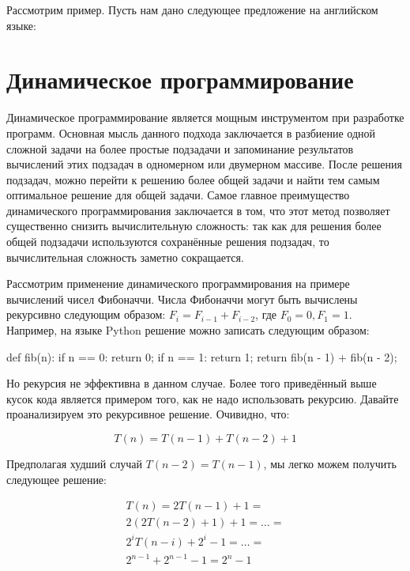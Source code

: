 Рассмотрим пример. Пусть нам дано следующее предложение на английском
языке: 


\section{Динамическое программирование}

Динамическое программирование является мощным инструментом 
при разработке программ. Основная мысль данного подхода заключается 
в разбиение одной сложной задачи на более простые подзадачи и запоминание 
результатов вычислений этих подзадач в одномерном или двумерном массиве. 
После решения подзадач, можно перейти к решению более общей задачи и найти тем 
самым оптимальное решение для общей задачи. Самое главное преимущество динамического
программирования заключается в том, что этот метод позволяет существенно снизить 
вычислительную сложность: так как для решения более общей подзадачи используются
сохранённые решения подзадач, то вычислительная сложность заметно сокращается. 

Рассмотрим применение динамического программирования на примере вычислений чисел Фибоначчи. Числа 
Фибоначчи могут быть вычислены рекурсивно следующим образом: $F_i = F_{i-1} + F_{i-2}$, 
где $F_0=0, F_1=1$. Например, на языке Python решение можно записать следующим образом:

\begin{python}
def fib(n):
	if n == 0:
		return 0;
	if n == 1:
		return 1;
	return fib(n - 1) + fib(n - 2);
\end{python}

Но рекурсия не эффективна в данном случае. Более того приведённый выше кусок кода 
является примером того, как не надо использовать рекурсию. Давайте проанализируем это 
рекурсивное решение. Очивидно, что:

$$
T(n) = T(n-1) + T(n-2) + 1
$$

Предполагая худший случай $T(n-2)=T(n-1)$, мы легко можем получить следующее решение:

\begin{equation*}
\begin{multlined}
T(n) = 2T(n-1) + 1= \\
	   2(2T(n-2) + 1) + 1 = 
	   \ldots = \\
	   2^{i}T(n-i) + 2^{i} - 1 = 
	   \ldots = \\
	   2^{n-1} + 2^{n-1} - 1 = 
	   2^{n} - 1
\end{multlined}
\end{equation*}

